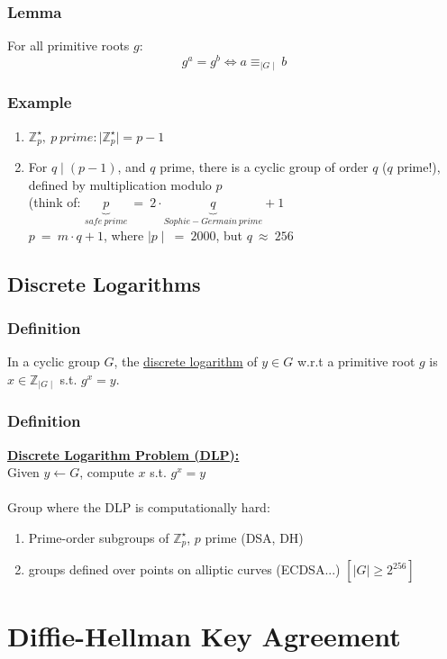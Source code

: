 \documentclass{report}
\begin{document}
	\subsubsection*{Lemma}
	For all primitive roots $g$:
	\[
		g^a = g^b \Leftrightarrow a \equiv _{\mid G \mid} b
	\]
	\subsubsection*{Example}
	\begin{enumerate}[\textbullet]
		\item $\mathbb{Z}_{p}^{\star}, \ p \ prime: \mid \mathbb{Z}_{p}^{\star} \mid = p-1$
		\item For $q \mid (p-1)$, and $q$ prime, there is a cyclic group of order $q$ ($q$ prime!), defined by multiplication modulo $p$ \\
		(think of: $\underbrace{p}_{safe \ prime} \ = \ 2 \cdot \underbrace{q}_{Sophie-Germain \ prime} + 1$ \\
		$p \ = \ m\cdot q + 1$, where $\mid p \mid \ = \ 2000$, but $q \ \approx \ 256$
	\end{enumerate}
	\subsection*{Discrete Logarithms}
	\subsubsection*{Definition}
	In a cyclic group $G$, the \underline{discrete logarithm} of $y \in G$ w.r.t a primitive root $g$ is $x \in \mathbb{Z}_{\mid G \mid}$ s.t. $g^x = y$.
	\subsubsection*{Definition}
	\textbf{\underline{Discrete Logarithm Problem (DLP):}} \\
	Given $y \leftarrow G$, compute $x$ s.t. $g^x = y$ \\ \\
	Group where the DLP is computationally hard:
	\begin{enumerate}[-]
		\item Prime-order subgroups of $\mathbb{Z}_{p}^{\star}$, $p$ prime (DSA, DH)
		\item groups defined over points on alliptic curves (ECDSA...) $[ \mid G \mid \geq 2^{256}]$
	\end{enumerate}
	
	\section*{Diffie-Hellman Key Agreement}
\end{document}
